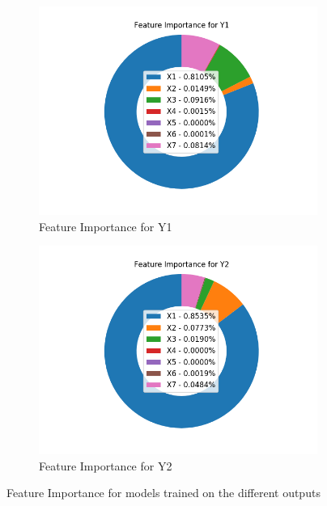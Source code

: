 \documentclass[12pt]{article}
\begin{document}
\begin{figure}[!ht]
\centering
\begin{subfigure}{.5\textwidth}
  \centering
  \includegraphics[width=\linewidth]{images/fiY1}
  \caption{Feature Importance for Y1}
  \label{fig:fiy1}
\end{subfigure}%
\begin{subfigure}{.5\textwidth}
  \centering
  \includegraphics[width=\linewidth]{images/fiY2}
  \caption{Feature Importance for Y2}
  \label{fig:fiy2}
\end{subfigure}
\caption{Feature Importance for models trained on the different outputs}
\label{fig:fi}
\end{figure}
\end{document}

